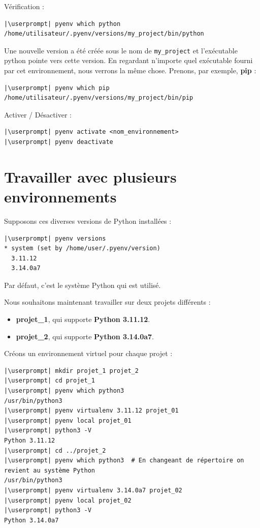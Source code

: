 Vérification :
\begin{lstlisting}[style=bash]
|\userprompt| pyenv which python
/home/utilisateur/.pyenv/versions/my_project/bin/python
\end{lstlisting}

Une nouvelle version a été créée sous le nom de \texttt{my\_project} et l'exécutable python pointe vers cette version. En regardant n'importe quel exécutable fourni par cet environnement, nous verrons la même chose. Prenons, par exemple, \textbf{pip} :
\begin{lstlisting}[style=bash]
|\userprompt| pyenv which pip
/home/utilisateur/.pyenv/versions/my_project/bin/pip
\end{lstlisting}

Activer / Désactiver :
\begin{lstlisting}[style=bash]
|\userprompt| pyenv activate <nom_environnement>
|\userprompt| pyenv deactivate
\end{lstlisting}

\section{Travailler avec plusieurs environnements}
Supposons ces diverses versions de Python installées :
\begin{lstlisting}[style=bash]
|\userprompt| pyenv versions
* system (set by /home/user/.pyenv/version)
  3.11.12
  3.14.0a7
\end{lstlisting}

Par défaut, c'est le système Python qui est utilisé.

Nous souhaitons maintenant travailler sur deux projets différents :
\begin{itemize}
    \item \textbf{projet\_1}, qui supporte \textbf{Python 3.11.12}.
    \item \textbf{projet\_2}, qui supporte \textbf{Python 3.14.0a7}.
\end{itemize}

Créons un environnement virtuel pour chaque projet :
\begin{lstlisting}[style=bash]
|\userprompt| mkdir projet_1 projet_2
|\userprompt| cd projet_1
|\userprompt| pyenv which python3
/usr/bin/python3
|\userprompt| pyenv virtualenv 3.11.12 projet_01
|\userprompt| pyenv local projet_01
|\userprompt| python3 -V
Python 3.11.12
|\userprompt| cd ../projet_2
|\userprompt| pyenv which python3  # En changeant de répertoire on revient au système Python
/usr/bin/python3
|\userprompt| pyenv virtualenv 3.14.0a7 projet_02
|\userprompt| pyenv local projet_02
|\userprompt| python3 -V
Python 3.14.0a7
\end{lstlisting}


